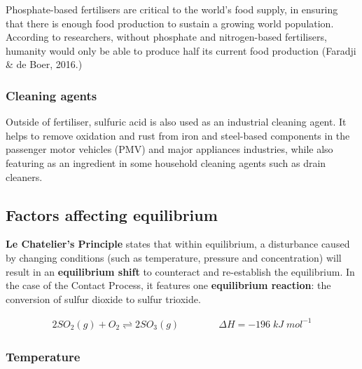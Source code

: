 \documentclass[12pt, a4paper]{article}
\begin{document}
Phosphate-based fertilisers are critical to the world's food supply, in ensuring that there is enough food production to sustain a growing world population. According to researchers, without phosphate and nitrogen-based fertilisers, humanity would only be able to produce half its current food production (Faradji \& de Boer, 2016.)

\subsubsection{Cleaning agents}
Outside of fertiliser, sulfuric acid is also used as an industrial cleaning agent. It helps to remove oxidation and rust from iron and steel-based components in the passenger motor vehicles (PMV) and major appliances industries, while also featuring as an ingredient in some household cleaning agents such as drain cleaners.


\subsection{Factors affecting equilibrium}

\textbf{Le Chatelier's Principle} states that within equilibrium, a disturbance caused by changing conditions (such as temperature, pressure and concentration) will result in an \textbf{equilibrium shift} to counteract and re-establish the equilibrium. In the case of the Contact Process, it features one \textbf{equilibrium reaction}: the conversion of sulfur dioxide to sulfur trioxide.

\begin{align}
	2SO_{2}(g) + O_{2} \rightleftharpoons 2SO_{3}(g) \qquad \qquad \Delta H = -196 \; kJ \; mol^{-1}
\end{align}






\subsubsection{Temperature}
\end{document}

